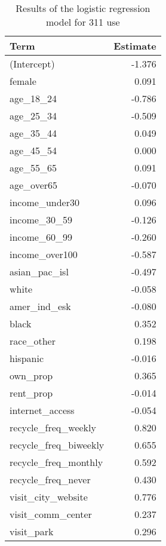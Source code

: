 \begin{table}[h!]
\label{tab:lrcoef}
\caption{Results of the logistic regression model for 311 use}
\centering
\begin{tabular}[t]{lr}
\toprule
\textbf{Term} & \textbf{Estimate}\\
\midrule
(Intercept) & -1.376\\
female & 0.091\\
age\_18\_24 & -0.786\\
age\_25\_34 & -0.509\\
age\_35\_44 & 0.049\\
\addlinespace
age\_45\_54 & 0.000\\
age\_55\_65 & 0.091\\
age\_over65 & -0.070\\
income\_under30 & 0.096\\
income\_30\_59 & -0.126\\
\addlinespace
income\_60\_99 & -0.260\\
income\_over100 & -0.587\\
asian\_pac\_isl & -0.497\\
white & -0.058\\
amer\_ind\_esk & -0.080\\
\addlinespace
black & 0.352\\
race\_other & 0.198\\
hispanic & -0.016\\
own\_prop & 0.365\\
rent\_prop & -0.014\\
\addlinespace
internet\_access & -0.054\\
recycle\_freq\_weekly & 0.820\\
recycle\_freq\_biweekly & 0.655\\
recycle\_freq\_monthly & 0.592\\
recycle\_freq\_never & 0.430\\
\addlinespace
visit\_city\_website & 0.776\\
visit\_comm\_center & 0.237\\
visit\_park & 0.296\\
\bottomrule
\end{tabular}
\end{table}